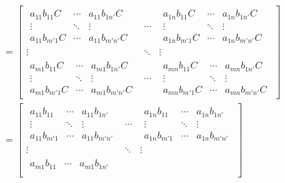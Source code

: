 \documentclass[10pt,oneside]{article}
\begin{document}
\begin{enumerate}
\begin{align*}
&= \begin{bmatrix}
   \begin{array}{ccc}
  a_{11}b_{11} C & \cdots & a_{11}b_{1n'}C \\
             \vdots & \ddots &           \vdots \\
  a_{11}b_{m'1} C & \cdots & a_{11}b_{m'n'} C
\end{array} & \cdots & \begin{array}{ccc}
  a_{1n}b_{11} C & \cdots & a_{1n}b_{1n'}C \\
             \vdots & \ddots &           \vdots \\
  a_{1n}b_{m'1} C & \cdots & a_{1n}b_{m'n'} C
\end{array} \\
             \vdots & \ddots &           \vdots \\
   \begin{array}{ccc}
  a_{m1}b_{11} C & \cdots & a_{m1}b_{1n'}C \\
             \vdots & \ddots &           \vdots \\
  a_{m1}b_{m'1} C & \cdots & a_{m1}b_{m'n'} C
\end{array} & \cdots &  \begin{array}{ccc}
  a_{mn}b_{11} C & \cdots & a_{mn}b_{1n'}C \\
             \vdots & \ddots &           \vdots \\
  a_{mn}b_{m'1} C & \cdots & a_{mn}b_{m'n'} C
\end{array}
\end{bmatrix} \\
&= \begin{bmatrix}
   \begin{array}{ccc}
  a_{11}b_{11}  & \cdots & a_{11}b_{1n'} \\
             \vdots & \ddots &           \vdots \\
  a_{11}b_{m'1}  & \cdots & a_{11}b_{m'n'} 
\end{array} & \cdots & \begin{array}{ccc}
  a_{1n}b_{11}  & \cdots & a_{1n}b_{1n'} \\
             \vdots & \ddots &           \vdots \\
  a_{1n}b_{m'1}  & \cdots & a_{1n}b_{m'n'} 
\end{array} \\
             \vdots & \ddots &           \vdots \\
   \begin{array}{ccc}
  a_{m1}b_{11}  & \cdots & a_{m1}b_{1n'} \\

\end{array}
\end{bmatrix}
\end{align*}
\end{enumerate}
\end{document}
